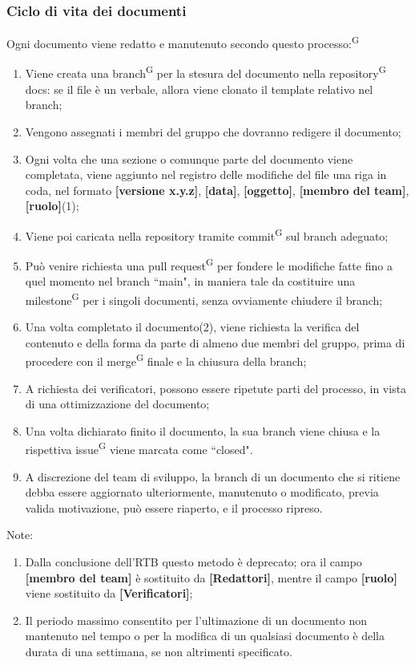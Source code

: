 \documentclass[8pt]{article}
\newcommand{\glossterm}[1]{#1\textsuperscript{G}} %
\begin{document}
\subsubsection{Ciclo di vita dei documenti}
Ogni documento viene redatto e manutenuto secondo questo \glossterm{processo:}
\begin{enumerate}
    \item Viene creata una \glossterm{branch} per la stesura del documento nella \glossterm{repository} docs: se il file è un verbale, allora viene clonato il template relativo nel branch;
    \item Vengono assegnati i membri del gruppo che dovranno redigere il documento; 
    \item Ogni volta che una sezione o comunque parte del documento viene completata, viene aggiunto
        nel registro delle modifiche del file una riga in coda, nel formato \textbf{[versione
        x.y.z]}, \textbf{[data]}, \textbf{[oggetto]}, \textbf{[membro del team]}, \textbf{[ruolo]}(1);  
    \item Viene poi caricata nella repository tramite \glossterm{commit} sul branch adeguato;
    \item Può venire richiesta una \glossterm{pull request} per fondere le modifiche fatte fino a quel momento
        nel branch ``main", in maniera tale da costituire una \glossterm{milestone} per i singoli documenti, senza ovviamente chiudere il branch;
    \item Una volta completato il documento(2), viene richiesta la verifica del contenuto e della forma
        da parte di almeno due membri del gruppo, prima di procedere con il \glossterm{merge} finale e la chiusura della branch; 
    \item A richiesta dei verificatori, possono essere ripetute parti del processo, in vista di una ottimizzazione del documento;
    \item Una volta dichiarato finito il documento, la sua branch viene chiusa e la rispettiva \glossterm{issue} viene marcata come ``closed".
    \item A discrezione del team di sviluppo, la branch di un documento che si ritiene debba essere aggiornato ulteriormente, manutenuto o modificato, previa valida motivazione, può essere riaperto, e il processo ripreso. 
\end{enumerate}
Note: \\
\begin{enumerate}
    \item Dalla conclusione dell'RTB questo metodo è deprecato; ora il campo \textbf{[membro del team]} è sostituito da \textbf{[Redattori]}, mentre il campo \textbf{[ruolo]} viene sostituito da \textbf{[Verificatori]};
    \item Il periodo massimo consentito per l'ultimazione di un documento non mantenuto nel tempo o per la modifica di un qualsiasi documento è della durata di una settimana, se non altrimenti specificato.
\end{enumerate}
\end{document}
